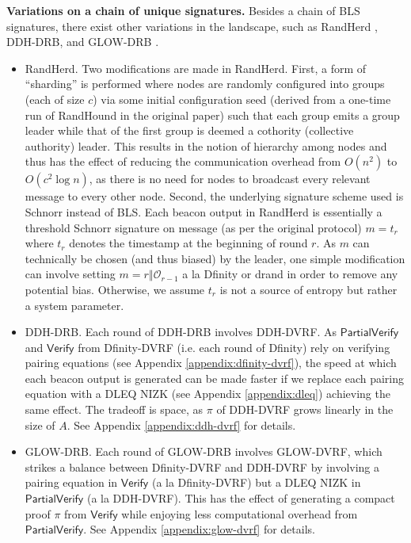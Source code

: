 \documentclass[letterpaper,twocolumn,10pt]{article}
\theoremstyle{definition}
\theoremstyle{remark}
\begin{document}
\noindent\textbf{Variations on a chain of unique signatures.} Besides a chain of BLS signatures, there exist other variations in the landscape, such as RandHerd \cite{syta2017scalable}, DDH-DRB, and GLOW-DRB \cite{galindo2020fully}.
\begin{itemize}
\item RandHerd. Two modifications are made in RandHerd. First, a form of ``sharding'' is performed where nodes are randomly configured into groups (each of size $c$) via some initial configuration seed (derived from a one-time run of RandHound in the original paper) such that each group emits a group leader while that of the first group is deemed a cothority (collective authority) leader. This results in the notion of hierarchy among nodes and thus has the effect of reducing the communication overhead from $O(n^2)$ to $O(c^2 \log n)$, as there is no need for nodes to broadcast every relevant message to every other node. Second, the underlying signature scheme used is Schnorr instead of BLS. Each beacon output in RandHerd is essentially a threshold Schnorr signature on message (as per the original protocol) $m = t_r$ where $t_r$ denotes the timestamp at the beginning of round $r$. As $m$ can technically be chosen (and thus biased) by the leader, one simple modification can involve setting $m = r \mathbin\Vert \mathcal{O}_{r - 1}$ a la Dfinity or drand in order to remove any potential bias. Otherwise, we assume $t_r$ is not a source of entropy but rather a system parameter.
\item DDH-DRB. Each round of DDH-DRB involves DDH-DVRF. As $\mathsf{PartialVerify}$ and $\mathsf{Verify}$ from Dfinity-DVRF (i.e. each round of Dfinity) rely on verifying pairing equations (see Appendix \ref{appendix:dfinity-dvrf}), the speed at which each beacon output is generated can be made faster if we replace each pairing equation with a DLEQ NIZK (see Appendix \ref{appendix:dleq}) achieving the same effect. The tradeoff is space, as $\pi$ of DDH-DVRF grows linearly in the size of $A$. See Appendix \ref{appendix:ddh-dvrf} for details.
\item GLOW-DRB. Each round of GLOW-DRB involves GLOW-DVRF, which strikes a balance between Dfinity-DVRF and DDH-DVRF by involving a pairing equation in $\mathsf{Verify}$ (a la Dfinity-DVRF) but a DLEQ NIZK in $\mathsf{PartialVerify}$ (a la DDH-DVRF). This has the effect of generating a compact proof $\pi$ from $\mathsf{Verify}$ while enjoying less computational overhead from $\mathsf{PartialVerify}$. See Appendix \ref{appendix:glow-dvrf} for details.
\end{itemize}
\end{document}
